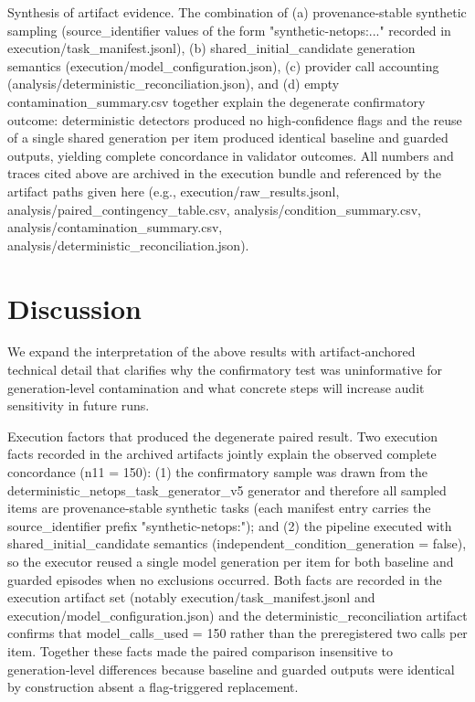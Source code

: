 \documentclass[conference]{IEEEtran}
\begin{document}
Synthesis of artifact evidence. The combination of (a) provenance‑stable synthetic sampling (source\_identifier values of the form "synthetic-netops:..." recorded in execution/task\_manifest.jsonl), (b) shared\_initial\_candidate generation semantics (execution/model\_configuration.json), (c) provider call accounting (analysis/deterministic\_reconciliation.json), and (d) empty contamination\_summary.csv together explain the degenerate confirmatory outcome: deterministic detectors produced no high‑confidence flags and the reuse of a single shared generation per item produced identical baseline and guarded outputs, yielding complete concordance in validator outcomes. All numbers and traces cited above are archived in the execution bundle and referenced by the artifact paths given here (e.g., execution/raw\_results.jsonl, analysis/paired\_contingency\_table.csv, analysis/condition\_summary.csv, analysis/contamination\_summary.csv, analysis/deterministic\_reconciliation.json).

\section{Discussion}
We expand the interpretation of the above results with artifact‑anchored technical detail that clarifies why the confirmatory test was uninformative for generation‑level contamination and what concrete steps will increase audit sensitivity in future runs.

Execution factors that produced the degenerate paired result. Two execution facts recorded in the archived artifacts jointly explain the observed complete concordance (n11 = 150): (1) the confirmatory sample was drawn from the deterministic\_netops\_task\_generator\_v5 generator and therefore all sampled items are provenance‑stable synthetic tasks (each manifest entry carries the source\_identifier prefix "synthetic-netops:"); and (2) the pipeline executed with shared\_initial\_candidate semantics (independent\_condition\_generation = false), so the executor reused a single model generation per item for both baseline and guarded episodes when no exclusions occurred. Both facts are recorded in the execution artifact set (notably execution/task\_manifest.jsonl and execution/model\_configuration.json) and the deterministic\_reconciliation artifact confirms that model\_calls\_used = 150 rather than the preregistered two calls per item. Together these facts made the paired comparison insensitive to generation‑level differences because baseline and guarded outputs were identical by construction absent a flag-triggered replacement.
\end{document}
